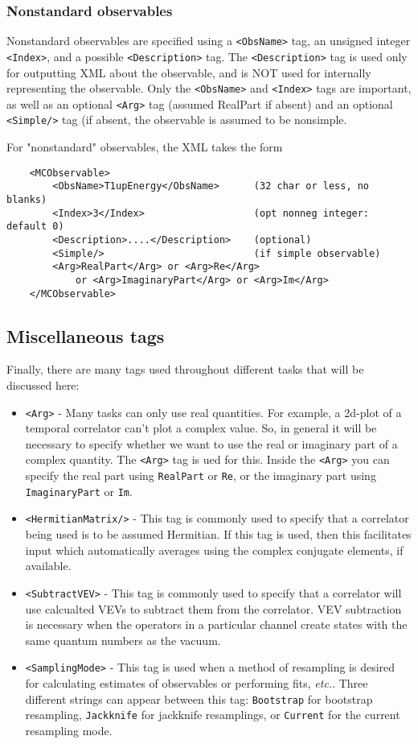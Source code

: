 \documentclass[12pt]{article}
\newcommand{\vb}{\texttt}
\begin{document}
\subsubsection{Nonstandard observables} \label{sec:nonstandard_obs}

Nonstandard observables are specified using a \vb{<ObsName>} tag,
an unsigned integer \vb{<Index>}, and a possible \vb{<Description>}
tag. The \vb{<Description>} tag is used only for outputting
XML about the observable, and is NOT used for internally
representing the observable. Only the \vb{<ObsName>} and \vb{<Index>}
tags are important, as well as an optional \vb{<Arg>} tag
(assumed RealPart if absent) and an optional \vb{<Simple/>}
tag (if absent, the observable is assumed to be nonsimple.                  

For "nonstandard" observables, the XML takes the form
\begin{verbatim}
    <MCObservable>
        <ObsName>T1upEnergy</ObsName>      (32 char or less, no blanks)
        <Index>3</Index>                   (opt nonneg integer: default 0)
        <Description>....</Description>    (optional)
        <Simple/>                          (if simple observable)
        <Arg>RealPart</Arg> or <Arg>Re</Arg>
            or <Arg>ImaginaryPart</Arg> or <Arg>Im</Arg>
    </MCObservable>
\end{verbatim}

\subsection{Miscellaneous tags}

Finally, there are many tags used throughout different tasks that will
be discussed here:
\begin{itemize}
\item \vb{<Arg>} - Many tasks can only use real quantities. For example, a 2d-plot of a
temporal correlator can't plot a complex value. So, in general it will be necessary
to specify whether we want to use the real or imaginary part of a complex quantity.
The \vb{<Arg>} tag is ued for this. Inside the \vb{<Arg>} you can specify the real part
using \vb{RealPart} or \vb{Re}, or the imaginary part using \vb{ImaginaryPart}
or \vb{Im}.
\item \vb{<HermitianMatrix/>} - This tag is commonly used to specify that a correlator
being used is to be assumed Hermitian. If this tag is used, then this facilitates
input which automatically averages using the complex conjugate
elements, if available.
\item \vb{<SubtractVEV>} - This tag is commonly used to specify that a correlator
will use calcualted VEVs to subtract them from the correlator. VEV subtraction is
necessary when the operators in a particular channel create states with
the same quantum numbers as the vacuum.
\item \vb{<SamplingMode>} - This tag is used when a method of resampling is desired
for calculating estimates of observables or performing fits, \textit{etc.}.
Three different strings can appear between this tag: \vb{Bootstrap} for
bootstrap resampling, \vb{Jackknife} for jackknife resamplings, or \vb{Current}
for the current resampling mode. 
\end{itemize}
\end{document}
